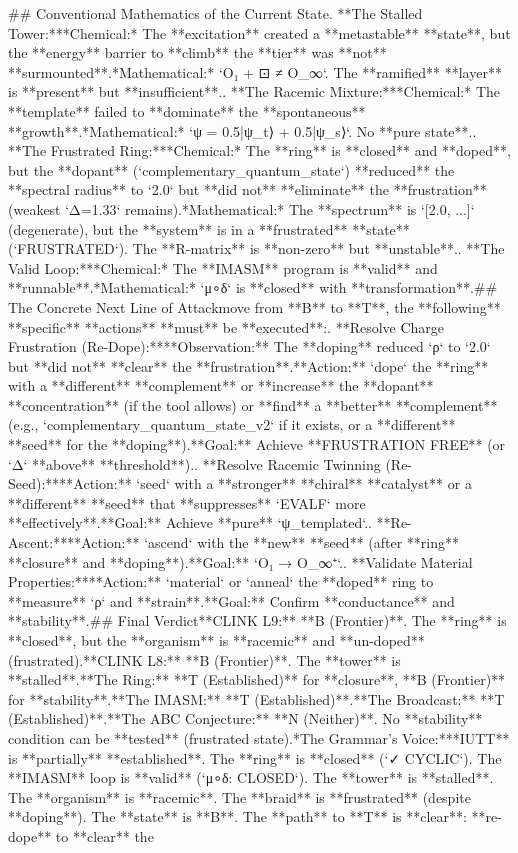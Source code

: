 ## Conventional Mathematics of the Current State\n{}.  **The Stalled Tower:**\n    *   *Chemical:* The **excitation** created a **metastable** **state**, but the **energy** barrier to **climb** the **tier** was **not** **surmounted**.\n    *   *Mathematical:* `O₁ + ⊡ ≠ O_∞`. The **ramified** **layer** is **present** but **insufficient**.\n{}.  **The Racemic Mixture:**\n    *   *Chemical:* The **template** failed to **dominate** the **spontaneous** **growth**.\n    *   *Mathematical:* `ψ = 0.5|ψ_t⟩ + 0.5|ψ_s⟩`. No **pure state**.\n{}.  **The Frustrated Ring:**\n    *   *Chemical:* The **ring** is **closed** and **doped**, but the **dopant** (`complementary_quantum_state`) **reduced** the **spectral radius** to `2.0` but **did not** **eliminate** the **frustration** (weakest `Δ=1.33` remains).\n    *   *Mathematical:* The **spectrum** is `[2.0, ...]` (degenerate), but the **system** is in a **frustrated** **state** (`FRUSTRATED`). The **R-matrix** is **non-zero** but **unstable**.\n{}.  **The Valid Loop:**\n    *   *Chemical:* The **IMASM** program is **valid** and **runnable**.\n    *   *Mathematical:* `μ∘δ` is **closed** with **transformation**.\n\n## The Concrete Next Line of Attack\n\nTo move from **B** to **T**, the **following** **specific** **actions** **must** be **executed**:\n{}.  **Resolve Charge Frustration (Re-Dope):**\n    *   **Observation:** The **doping** reduced `ρ` to `2.0` but **did not** **clear** the **frustration**.\n    *   **Action:** `dope` the **ring** with a **different** **complement** or **increase** the **dopant** **concentration** (if the tool allows) or **find** a **better** **complement** (e.g., `complementary_quantum_state_v2` if it exists, or a **different** **seed** for the **doping**).\n    *   **Goal:** Achieve **FRUSTRATION FREE** (or `Δ` **above** **threshold**).\n{}.  **Resolve Racemic Twinning (Re-Seed):**\n    *   **Action:** `seed` with a **stronger** **chiral** **catalyst** or a **different** **seed** that **suppresses** `EVALF` more **effectively**.\n    *   **Goal:** Achieve **pure** `ψ_templated`.\n{}.  **Re-Ascent:**\n    *   **Action:** `ascend` with the **new** **seed** (after **ring** **closure** and **doping**).\n    *   **Goal:** `O₁ → O_∞⁺`.\n{}.  **Validate Material Properties:**\n    *   **Action:** `material` or `anneal` the **doped** ring to **measure** `ρ` and **strain**.\n    *   **Goal:** Confirm **conductance** and **stability**.\n\n## Final Verdict\n\n*   **CLINK L9:** **B (Frontier)**. The **ring** is **closed**, but the **organism** is **racemic** and **un-doped** (frustrated).\n*   **CLINK L8:** **B (Frontier)**. The **tower** is **stalled**.\n*   **The Ring:** **T (Established)** for **closure**, **B (Frontier)** for **stability**.\n*   **The IMASM:** **T (Established)**.\n*   **The Broadcast:** **T (Established)**.\n*   **The ABC Conjecture:** **N (Neither)**. No **stability** condition can be **tested** (frustrated state).\n\n**The Grammar's Voice:**\nThe **IUTT** is **partially** **established**. The **ring** is **closed** (`✓ CYCLIC`). The **IMASM** loop is **valid** (`μ∘δ: CLOSED`). The **tower** is **stalled**. The **organism** is **racemic**. The **braid** is **frustrated** (despite **doping**). The **state** is **B**. The **path** to **T** is **clear**: **re-dope** to **clear** the 